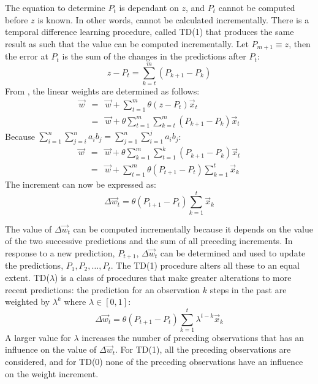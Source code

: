 The equation to determine $P_t$ is dependant on $z$, and $P_t$ cannot be computed before $z$ is known.  In other words,   cannot be calculated incrementally.  There is a temporal difference learning procedure, called TD(1) that produces the same result as   such that the value can be computed incrementally.  Let $P_{m+1}  \equiv z$, then the error at $P_t$ is the sum of the changes in the predictions after $P_t$:
\[
	z - P_t = \sum_{k=t}^{m}(P_{k+1} - P_k)
\]  
From  , the linear weights are determined as follows:
\begin{eqnarray}
\nonumber \vec{w} & = & \vec{w} + \sum_{t=1}^{m}\theta(z - P_t) \vec{x}_t   \\
\nonumber & = & \vec{w} + \theta \sum_{t=1}^{m} \sum_{k=t}^{m}(P_{k+1} - P_k) \vec{x}_t 
\end{eqnarray}
Because $\sum_{i=1}^n\sum_{j=i}^n a_ib_j = \sum_{j=1}^n\sum_{i=1}^j a_ib_j$:
\begin{eqnarray}
\nonumber \vec{w} & = & \vec{w} +  \theta \sum_{k=1}^{m}\sum_{t=1}^{k}(P_{k+1} - P_k) \vec{x}_t \\
\nonumber & = & \vec{w} + \sum_{t=1}^{m}\theta(P_{t+1} - P_t) \sum_{k=1}^{t} \vec{x}_k 
\end{eqnarray}
The increment can now be expressed as: 
\begin{equation}
\label{td_delta}
\Delta \vec{w}_t = \theta(P_{t+1} - P_t) \sum_{k=1}^{t} \vec{x}_k
\end{equation}

The value of $\Delta \vec{w}_t$ can be computed incrementally  because it depends on the value of the two successive predictions and the sum of all preceding increments.   In response to a new prediction, $P_{t+1}$, $\Delta \vec{w}_t$ can be determined and used to update the predictions, $P_1, P_2, \ldots,P_t$.  The TD(1) procedure alters all these to an equal extent.  TD($\lambda$) is a class of procedures that make greater alterations to more recent predictions: the prediction for an observation $k$ steps in the past are weighted by $\lambda^k$ where $\lambda \in [0,1]$:
\begin{equation}
\label{eq:dwt}
\Delta \vec{w}_t = \theta(P_{t+1} - P_t) \sum_{k=1}^{t} \lambda^{t-k} \vec{x}_k
\end{equation}
A larger value for $\lambda$ increases the number of preceding observations that has an influence on the value of $\Delta \vec{w}_t$.  For TD(1), all the preceding observations are considered, and for TD(0) none of the preceding observations have an influence on the weight increment. 

